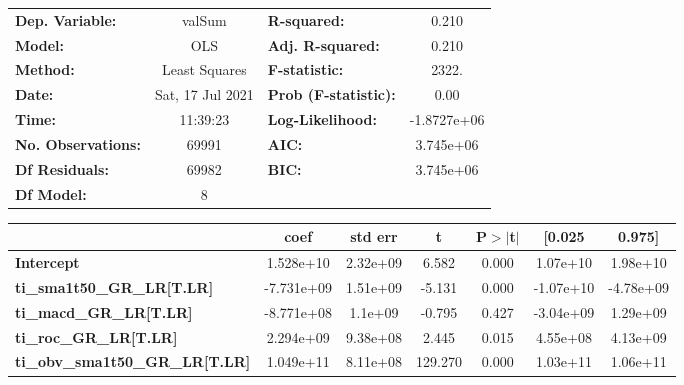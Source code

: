 \begin{center}
\begin{tabular}{lclc}
\toprule
\textbf{Dep. Variable:}                 &      valSum      & \textbf{  R-squared:         } &      0.210   \\
\textbf{Model:}                         &       OLS        & \textbf{  Adj. R-squared:    } &      0.210   \\
\textbf{Method:}                        &  Least Squares   & \textbf{  F-statistic:       } &      2322.   \\
\textbf{Date:}                          & Sat, 17 Jul 2021 & \textbf{  Prob (F-statistic):} &      0.00    \\
\textbf{Time:}                          &     11:39:23     & \textbf{  Log-Likelihood:    } & -1.8727e+06  \\
\textbf{No. Observations:}              &       69991      & \textbf{  AIC:               } &  3.745e+06   \\
\textbf{Df Residuals:}                  &       69982      & \textbf{  BIC:               } &  3.745e+06   \\
\textbf{Df Model:}                      &           8      & \textbf{                     } &              \\
\bottomrule
\end{tabular}
\begin{tabular}{lcccccc}
                                        & \textbf{coef} & \textbf{std err} & \textbf{t} & \textbf{P$> |$t$|$} & \textbf{[0.025} & \textbf{0.975]}  \\
\midrule
\textbf{Intercept}                      &    1.528e+10  &     2.32e+09     &     6.582  &         0.000        &     1.07e+10    &     1.98e+10     \\
\textbf{ti\_sma1t50\_GR\_LR[T.LR]}      &   -7.731e+09  &     1.51e+09     &    -5.131  &         0.000        &    -1.07e+10    &    -4.78e+09     \\
\textbf{ti\_macd\_GR\_LR[T.LR]}         &   -8.771e+08  &      1.1e+09     &    -0.795  &         0.427        &    -3.04e+09    &     1.29e+09     \\
\textbf{ti\_roc\_GR\_LR[T.LR]}          &    2.294e+09  &     9.38e+08     &     2.445  &         0.015        &     4.55e+08    &     4.13e+09     \\
\textbf{ti\_obv\_sma1t50\_GR\_LR[T.LR]} &    1.049e+11  &     8.11e+08     &   129.270  &         0.000        &     1.03e+11    &     1.06e+11     \\

\end{tabular}
\end{center}
